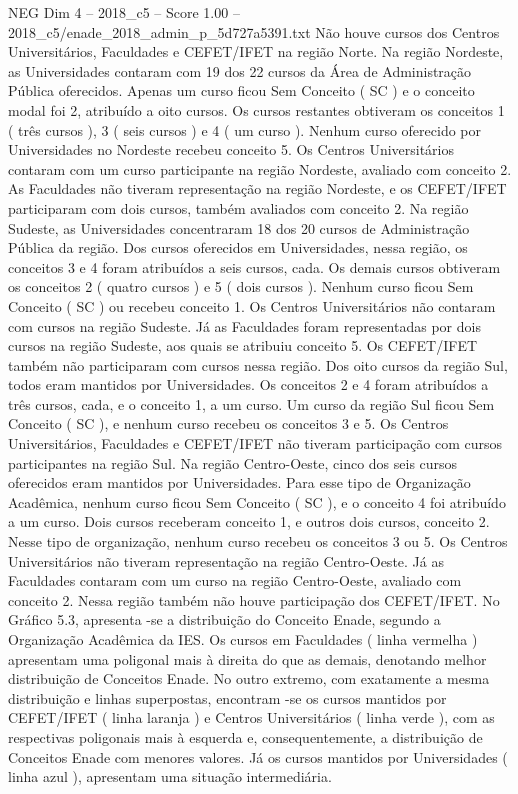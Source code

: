 \begin{textsample}{NEG Dim 4 – 2018\_c5 – Score 1.00 – 2018\_c5/enade\_2018\_admin\_p\_5d727a5391.txt}
Não houve cursos dos Centros Universitários, Faculdades e CEFET/IFET na região Norte.
Na região Nordeste, as Universidades contaram com 19 dos 22 cursos da Área de Administração Pública oferecidos.
Apenas um curso ficou Sem Conceito ( SC ) e o conceito modal foi 2, atribuído a oito cursos.
Os cursos restantes obtiveram os conceitos 1 ( três cursos ), 3 ( seis cursos ) e 4 ( um curso ).
Nenhum curso oferecido por Universidades no Nordeste recebeu conceito 5.
Os Centros Universitários contaram com um curso participante na região Nordeste, avaliado com conceito 2.
As Faculdades não tiveram representação na região Nordeste, e os CEFET/IFET participaram com dois cursos, também avaliados com conceito 2.
Na região Sudeste, as Universidades concentraram 18 dos 20 cursos de Administração Pública da região.
Dos cursos oferecidos em Universidades, nessa região, os conceitos 3 e 4 foram atribuídos a seis cursos, cada.
Os demais cursos obtiveram os conceitos 2 ( quatro cursos ) e 5 ( dois cursos ).
Nenhum curso ficou Sem Conceito ( SC ) ou recebeu conceito 1.
Os Centros Universitários não contaram com cursos na região Sudeste.
Já as Faculdades foram representadas por dois cursos na região Sudeste, aos quais se atribuiu conceito 5.
Os CEFET/IFET também não participaram com cursos nessa região.
Dos oito cursos da região Sul, todos eram mantidos por Universidades.
Os conceitos 2 e 4 foram atribuídos a três cursos, cada, e o conceito 1, a um curso.
Um curso da região Sul ficou Sem Conceito ( SC ), e nenhum curso recebeu os conceitos 3 e 5.
Os Centros Universitários, Faculdades e CEFET/IFET não tiveram participação com cursos participantes na região Sul.
Na região Centro-Oeste, cinco dos seis cursos oferecidos eram mantidos por Universidades.
Para esse tipo de Organização Acadêmica, nenhum curso ficou Sem Conceito ( SC ), e o conceito 4 foi atribuído a um curso.
Dois cursos receberam conceito 1, e outros dois cursos, conceito 2.
Nesse tipo de organização, nenhum curso recebeu os conceitos 3 ou 5.
Os Centros Universitários não tiveram representação na região Centro-Oeste.
Já as Faculdades contaram com um curso na região Centro-Oeste, avaliado com conceito 2.
Nessa região também não houve participação dos CEFET/IFET.
No Gráfico 5.3, apresenta -se a distribuição do Conceito Enade, segundo a Organização Acadêmica da IES.
Os cursos em Faculdades ( linha vermelha ) apresentam uma poligonal mais à direita do que as demais, denotando melhor distribuição de Conceitos Enade.
No outro extremo, com exatamente a mesma distribuição e linhas superpostas, encontram -se os cursos mantidos por CEFET/IFET ( linha laranja ) e Centros Universitários ( linha verde ), com as respectivas poligonais mais à esquerda e, consequentemente, a distribuição de Conceitos Enade com menores valores.
Já os cursos mantidos por Universidades ( linha azul ), apresentam uma situação intermediária.

\end{textsample}
